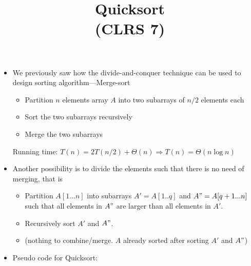 \documentclass[11pt]{article}
\begin{document}
\title{{\bf Quicksort}\\
\normalsize{(CLRS 7)}}

\date{}

\maketitle



\begin{itemize}
\item We previously saw how the divide-and-conquer technique can be
used to design sorting algorithm---Merge-sort
   \begin{itemize}
   \item Partition $n$ elements array $A$ into two subarrays of $n/2$ elements
   each
   \item Sort the two subarrays recursively
   \item Merge the two subarrays
   \end{itemize}

   Running time: $T(n)=2T(n/2)+\Theta(n) \Rightarrow T(n)=\Theta(n\log n)$

\item Another possibility is to divide the elements such that there is
no need of merging, that is
   \begin{itemize}
   \item Partition $A[1...n]$ into subarrays $A'=A[1..q]$ and
   $A"=A[q+1...n]$ such that all elements in $A"$ are larger than all
   elements in $A'$.
   \item Recursively sort $A'$ and $A"$.
   \item (nothing to combine/merge. $A$ already sorted after sorting $A'$
    and $A"$)
   \end{itemize}

\item Pseudo code for {\sc Quicksort}:

\\


\end{itemize}
\end{document}
